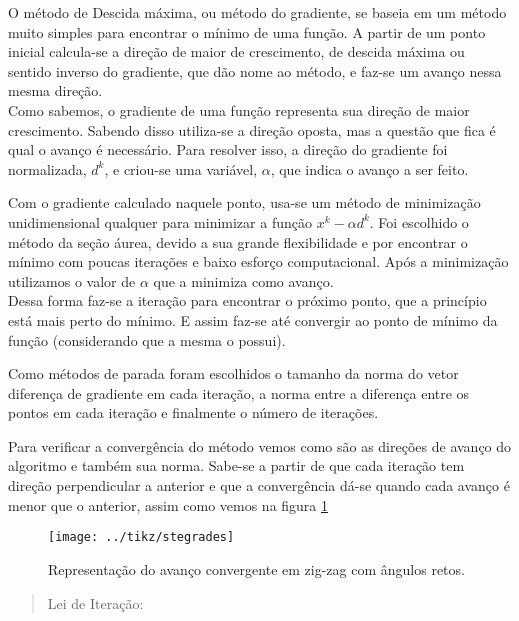 O método de Descida máxima, ou método do gradiente, se baseia em um método muito simples para encontrar o mínimo de uma função.
 A partir de um ponto inicial calcula-se a direção de maior de crescimento, de descida máxima ou sentido inverso do gradiente, que dão nome ao método, 
e faz-se um avanço nessa mesma direção.\\
 
Como sabemos, o gradiente de uma função representa sua direção de maior crescimento. Sabendo disso utiliza-se a direção oposta, 
mas a questão que fica é qual o avanço é necessário. Para resolver isso, a direção do gradiente foi normalizada, $d^k$, e criou-se uma variável, $\alpha$, que indica o avanço a ser feito. 

Com o gradiente calculado naquele ponto, usa-se um método de minimização unidimensional qualquer para minimizar a função $x^k - \alpha d^k$. 
Foi escolhido o método da seção áurea, devido a sua grande flexibilidade e por encontrar o mínimo com poucas iterações e baixo esforço computacional. 
Após a minimização utilizamos o valor de $\alpha$ que a minimiza como avanço.
\\
Dessa forma faz-se a iteração para encontrar o próximo ponto, que a princípio 
está mais perto do mínimo. E assim faz-se até convergir ao ponto de mínimo da função (considerando que a mesma o possui).

Como métodos de parada foram escolhidos o tamanho da norma do vetor diferença de gradiente em cada iteração, a norma entre a diferença entre os pontos em cada iteração e finalmente o número de iterações.

Para verificar a convergência do método vemos como são as direções de avanço do algoritmo e também sua norma. Sabe-se a partir de \cite{Notastioafel} que cada iteração tem direção perpendicular a anterior e que a convergência dá-se quando cada avanço é menor que o anterior, assim como vemos na figura \ref{fig:stegradeszigzag}


\begin{figure}[H]
	\begin{center}
		\texttt{[image: ../tikz/stegrades]}  
		\caption{Representação do avanço convergente em zig-zag com ângulos retos.}
		\label{fig:stegradeszigzag}
	\end{center}
\end{figure}


	\begin{quote}
		\centering
		Lei de Iteração:
	\end{quote}

